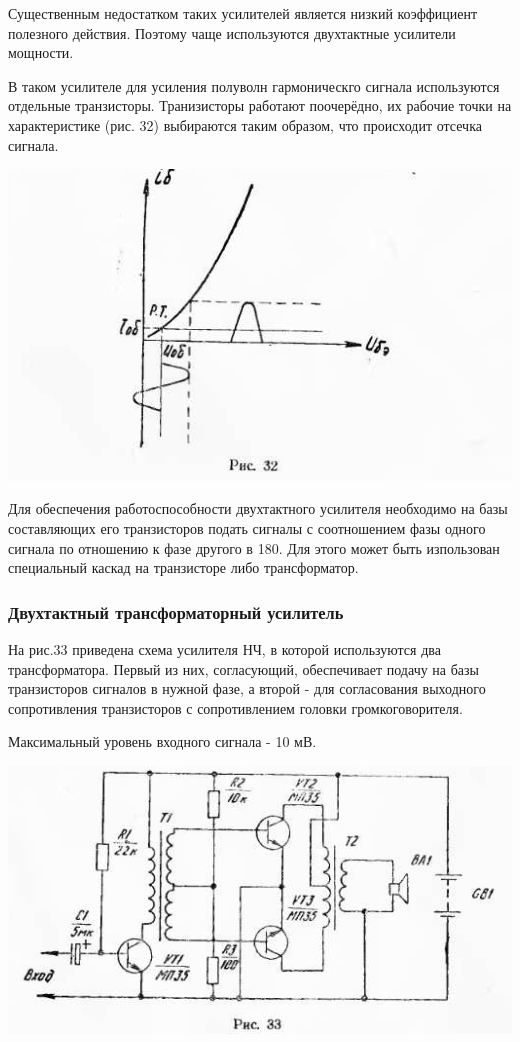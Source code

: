 \documentclass[12pt]{article}
\begin{document}
Существенным недостатком таких усилителей является низкий коэффициент полезного действия. Поэтому чаще используются двухтактные усилители мощности.

В таком усилителе для усиления полуволн гармоническго сигнала используются отдельные транзисторы. Транизисторы работают поочерёдно, их рабочие точки на характеристике (рис. 32) выбираются таким образом, что происходит отсечка сигнала.

\includegraphics[scale=0.81, angle=1.5]{ekon3_028_2}

\newpage

Для обеспечения работоспособности двухтактного усилителя необходимо на базы составляющих его транзисторов подать сигналы с соотношением фазы одного сигнала по отношению к фазе другого в 180\degree. Для этого может быть изпользован специальный каскад на транзисторе либо трансформатор.

\subsubsection{Двухтактный трансформаторный усилитель}
На рис.33 приведена схема усилителя НЧ, в которой используются два трансформатора. Первый из них, согласующий, обеспечивает подачу на базы транзисторов сигналов в нужной фазе, а второй - для согласования выходного сопротивления транзисторов с сопротивлением головки громкоговорителя.

Максимальный уровень входного сигнала - 10 мВ.

\vspace*{1cm}
\includegraphics[scale=0.85, angle=1]{ekon3_029_1}
\vspace*{1cm}
\end{document}
